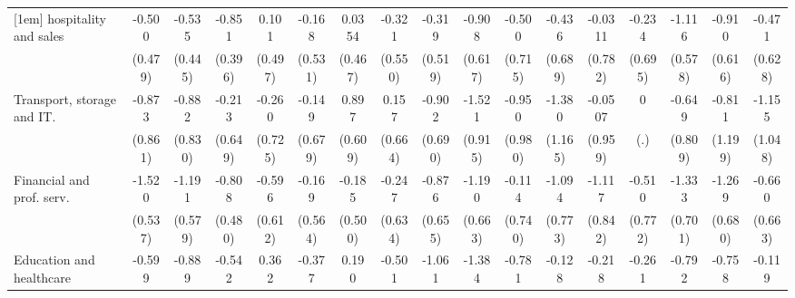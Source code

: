 {\begin{tabular}{l*{16}{c}}
[1em]
hospitality and sales&      -0.500         &      -0.535         &      -0.851\sym{*}  &       0.101         &      -0.168         &      0.0354         &      -0.321         &      -0.319         &      -0.908         &      -0.500         &      -0.436         &     -0.0311         &      -0.234         &      -1.116         &      -0.910         &      -0.471         \\
                    &     (0.479)         &     (0.445)         &     (0.396)         &     (0.497)         &     (0.531)         &     (0.467)         &     (0.550)         &     (0.519)         &     (0.617)         &     (0.715)         &     (0.689)         &     (0.782)         &     (0.695)         &     (0.578)         &     (0.616)         &     (0.628)         \\
[1em]
Transport, storage and IT.&      -0.873         &      -0.882         &      -0.213         &      -0.260         &      -0.149         &       0.897         &       0.157         &      -0.902         &      -1.521         &      -0.950         &      -1.380         &     -0.0507         &           0         &      -0.649         &      -0.811         &      -1.155         \\
                    &     (0.861)         &     (0.830)         &     (0.649)         &     (0.725)         &     (0.679)         &     (0.609)         &     (0.664)         &     (0.690)         &     (0.915)         &     (0.980)         &     (1.165)         &     (0.959)         &         (.)         &     (0.809)         &     (1.199)         &     (1.048)         \\
[1em]
Financial and prof. serv.&      -1.520\sym{**} &      -1.191\sym{*}  &      -0.808         &      -0.596         &      -0.169         &      -0.185         &      -0.247         &      -0.876         &      -1.190         &      -0.114         &      -1.094         &      -1.117         &      -0.510         &      -1.333         &      -1.269         &      -0.660         \\
                    &     (0.537)         &     (0.579)         &     (0.480)         &     (0.612)         &     (0.564)         &     (0.500)         &     (0.634)         &     (0.655)         &     (0.663)         &     (0.740)         &     (0.773)         &     (0.842)         &     (0.772)         &     (0.701)         &     (0.680)         &     (0.663)         \\
[1em]
Education and healthcare&      -0.599         &      -0.889         &      -0.542         &       0.362         &      -0.377         &       0.190         &      -0.501         &      -1.061         &      -1.384\sym{*}  &      -0.781         &      -0.128         &      -0.218         &      -0.261         &      -0.792         &      -0.758         &      -0.119         \\

\end{tabular}}
